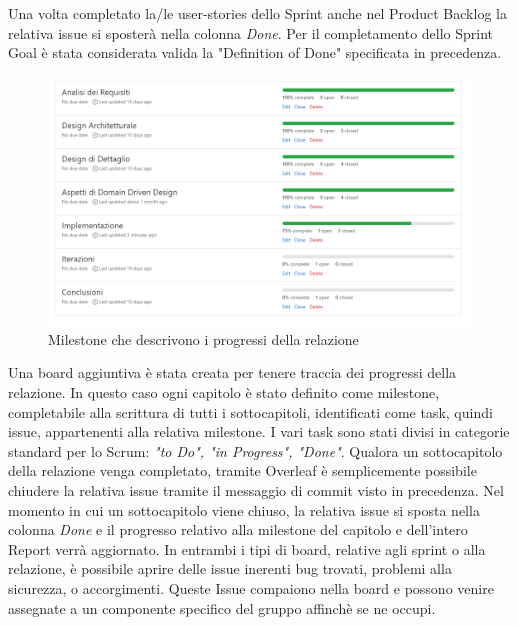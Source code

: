     Una volta completato la/le user-stories dello Sprint anche nel Product Backlog la relativa issue si sposterà nella colonna \textit{Done}. 
    Per il completamento dello Sprint Goal è stata considerata valida la "Definition of Done" specificata in precedenza.
    \begin{figure}[H]
        \caption{Milestone che descrivono i progressi della relazione}
        \centering
       \includegraphics[width=1\textwidth]{Images/milestone_relazione.png}
    \end{figure}
    Una board aggiuntiva è stata creata per tenere traccia dei progressi della relazione. In questo caso ogni capitolo è stato definito come milestone, completabile alla scrittura di tutti i sottocapitoli, identificati come task, quindi issue, appartenenti alla relativa milestone.
    I vari task sono stati divisi in categorie standard per lo Scrum: \textit{"to Do", "in Progress", "Done"}.
    Qualora un sottocapitolo della relazione venga completato, tramite Overleaf è semplicemente possibile chiudere la relativa issue tramite il messaggio di commit visto in precedenza.
    Nel momento in cui un sottocapitolo viene chiuso, la relativa issue si sposta nella colonna \textit{Done} e il progresso relativo alla milestone del capitolo e dell'intero Report verrà aggiornato.
    In entrambi i tipi di board, relative agli sprint o alla relazione, è possibile aprire delle issue inerenti bug trovati, problemi alla sicurezza, o accorgimenti. Queste Issue compaiono nella board e possono venire assegnate a un componente specifico del gruppo affinchè se ne occupi.
    
